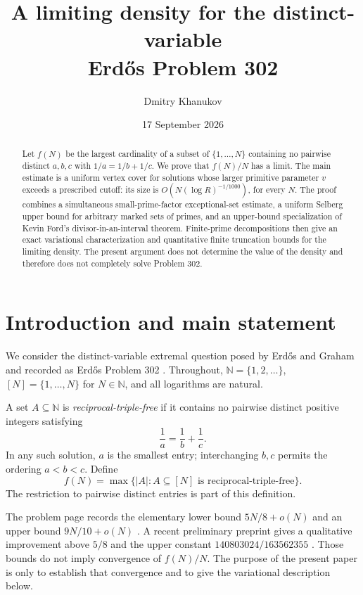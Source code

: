 \documentclass[11pt]{article}
\title{A limiting density for the distinct-variable\\ Erd\H{o}s Problem 302}
\author{Dmitry Khanukov}
\date{17 September 2026}
\theoremstyle{definition}
\theoremstyle{remark}
\numberwithin{equation}{section}
\newcommand{\N}{\mathbb N}
\begin{document}
\maketitle

\begin{abstract}
Let \(f(N)\) be the largest cardinality of a subset of
\(\{1,\ldots,N\}\) containing no pairwise distinct \(a,b,c\) with
\(1/a=1/b+1/c\). We prove that \(f(N)/N\) has a limit. The main
estimate is a uniform vertex cover for solutions whose larger primitive
parameter \(v\) exceeds a prescribed cutoff: its size is
\(O(N(\log R)^{-1/1000})\), for every \(N\). The proof combines a
simultaneous small-prime-factor exceptional-set estimate, a uniform
Selberg upper bound for arbitrary marked sets of primes, and an
upper-bound specialization of Kevin Ford's divisor-in-an-interval
theorem. Finite-prime decompositions then give an exact variational
characterization and quantitative finite truncation bounds for the limiting
density. The present argument does not determine the value of the density
and therefore does not completely solve Problem 302.
\end{abstract}

\section{Introduction and main statement}

We consider the distinct-variable extremal question posed by Erd\H{o}s and
Graham \cite{EG1980} and recorded as Erd\H{o}s Problem 302
\cite{EP302}. Throughout,
\(\N=\{1,2,\ldots\}\), \([N]=\{1,\ldots,N\}\) for \(N\in\N\), and
all logarithms are natural.

A set \(A\subseteq\N\) is \emph{reciprocal-triple-free} if it contains
no pairwise distinct positive integers satisfying
\begin{equation}\label{eq:reciprocal}
 \frac1a=\frac1b+\frac1c.
\end{equation}
In any such solution, \(a\) is the smallest entry; interchanging
\(b,c\) permits the ordering \(a<b<c\). Define
\[
 f(N)=\max\{|A|:A\subseteq[N]\text{ is reciprocal-triple-free}\}.
\]
The restriction to pairwise distinct entries is part of this
definition.

The problem page records the elementary lower bound \(5N/8+o(N)\)
and an upper bound \(9N/10+o(N)\) \cite{EP302}. A recent preliminary
preprint gives a qualitative improvement above \(5/8\) and the upper
constant \(140803024/163562355\) \cite{Khanukov2026}. Those bounds do
not imply convergence of \(f(N)/N\). The purpose of the present paper
is only to establish that convergence and to give the variational
description below.
\end{document}
